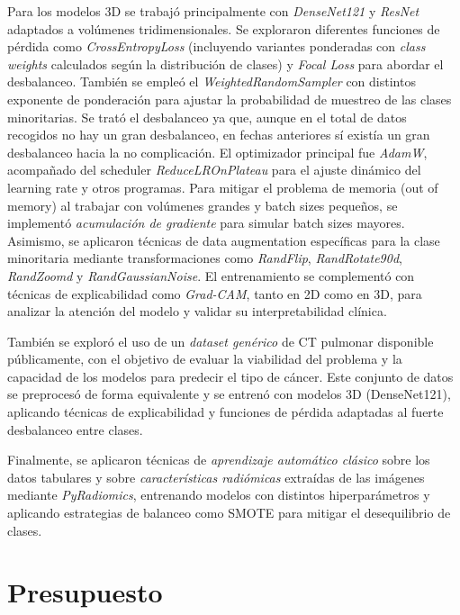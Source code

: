 Para los modelos 3D se trabajó principalmente con \textit{DenseNet121} y \textit{ResNet} adaptados a volúmenes tridimensionales. Se exploraron diferentes funciones de pérdida como \textit{CrossEntropyLoss} (incluyendo variantes ponderadas con \textit{class weights} calculados según la distribución de clases) y \textit{Focal Loss} para abordar el desbalanceo. También se empleó el \textit{WeightedRandomSampler} con distintos exponente de ponderación para ajustar la probabilidad de muestreo de las clases minoritarias. Se trató el desbalanceo ya que, aunque en el total de datos recogidos no hay un gran desbalanceo, en fechas anteriores sí existía un gran desbalanceo hacia la no complicación. El optimizador principal fue \textit{AdamW}, acompañado del scheduler \textit{ReduceLROnPlateau} para el ajuste dinámico del learning rate y otros programas. Para mitigar el problema de memoria (out of memory) al trabajar con volúmenes grandes y batch sizes pequeños, se implementó \textit{acumulación de gradiente} para simular batch sizes mayores. Asimismo, se aplicaron técnicas de data augmentation específicas para la clase minoritaria mediante transformaciones como \textit{RandFlip}, \textit{RandRotate90d}, \textit{RandZoomd} y \textit{RandGaussianNoise}. El entrenamiento se complementó con técnicas de explicabilidad como \textit{Grad-CAM}, tanto en 2D como en 3D, para analizar la atención del modelo y validar su interpretabilidad clínica.

También se exploró el uso de un \textit{dataset genérico} de CT pulmonar disponible públicamente, con el objetivo de evaluar la viabilidad del problema y la capacidad de los modelos para predecir el tipo de cáncer. Este conjunto de datos se preprocesó de forma equivalente y se entrenó con modelos 3D (DenseNet121), aplicando técnicas de explicabilidad y funciones de pérdida adaptadas al fuerte desbalanceo entre clases. 

Finalmente, se aplicaron técnicas de \textit{aprendizaje automático clásico} sobre los datos tabulares y sobre \textit{características radiómicas} extraídas de las imágenes mediante \textit{PyRadiomics}, entrenando modelos con distintos hiperparámetros y aplicando estrategias de balanceo como SMOTE para mitigar el desequilibrio de clases.



\section{Presupuesto}

